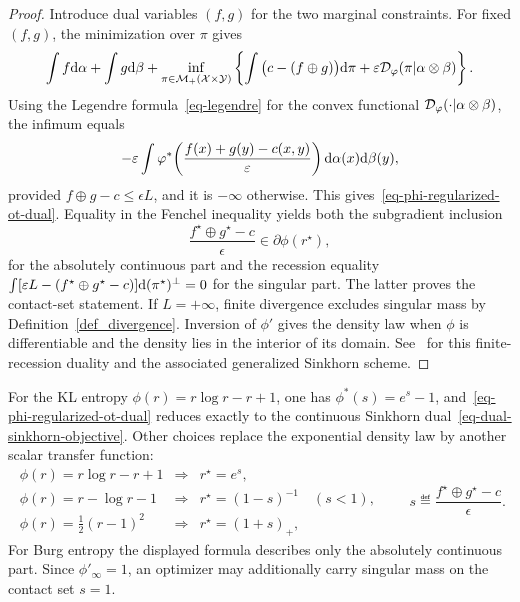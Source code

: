 \begin{proof}
	Introduce dual variables $(f,g)$ for the two marginal constraints. For fixed $(f,g)$, the minimization over $\pi$ gives
	\[
		\int f\mathrm{d}\alpha+\int g\mathrm{d}\beta
		+
		\inf_{\pi\in\mathcal{M}_+(\mathcal{X}\times\mathcal{Y})}
		\left\{
		\int\big(c-(f\oplus g)\big)\mathrm{d}\pi
		+
		\varepsilon\mathcal{D}_\varphi(\pi|\alpha\otimes\beta)
		\right\}.
	\]
	Using the Legendre formula~\eqref{eq-legendre} for the convex functional $\mathcal{D}_\varphi(\cdot|\alpha\otimes\beta)$, the infimum equals
	\[
		-\varepsilon
		\int
		\varphi^*\!\left(\frac{f(x)+g(y)-c(x,y)}{\varepsilon}\right)
		\mathrm{d}\alpha(x)\mathrm{d}\beta(y),
	\]
	provided $f\oplus g-c\leq\epsilon L$, and it is $-\infty$ otherwise. This gives~\eqref{eq-phi-regularized-ot-dual}. Equality in the Fenchel inequality yields both the subgradient inclusion
	\[
		\frac{f^\star\oplus g^\star-c}{\epsilon}
		\in
		\partial\phi(r^\star),
	\]
	for the absolutely continuous part and the recession equality
	$\int[\varepsilon L-(f^\star\oplus g^\star-c)]\mathrm{d}(\pi^\star)^\perp=0$ for the singular part. The latter proves the contact-set statement. If $L=+\infty$, finite divergence excludes singular mass by Definition~\ref{def_divergence}. Inversion of $\phi'$ gives the density law when $\phi$ is differentiable and the density lies in the interior of its domain. See~\cite{TerjekGonzalezSanchez2022} for this finite-recession duality and the associated generalized Sinkhorn scheme.
\end{proof}

For the KL entropy $\phi(r)=r\log r-r+1$, one has $\phi^*(s)=e^s-1$, and~\eqref{eq-phi-regularized-ot-dual} reduces exactly to the continuous Sinkhorn dual~\eqref{eq-dual-sinkhorn-objective}. Other choices replace the exponential density law by another scalar transfer function:
\[
\begin{array}{lll}
	\phi(r)=r\log r-r+1 &\Rightarrow& r^\star=e^s,\\[.25em]
	\phi(r)=r-\log r-1 &\Rightarrow& r^\star=(1-s)^{-1}\quad (s<1),\\[.25em]
	\phi(r)=\frac12(r-1)^2 &\Rightarrow& r^\star=(1+s)_+,
\end{array}
\qquad
s\eqdef\frac{f^\star\oplus g^\star-c}{\epsilon}.
\]
For Burg entropy the displayed formula describes only the absolutely continuous part. Since $\phi'_\infty=1$, an optimizer may additionally carry singular mass on the contact set $s=1$.


